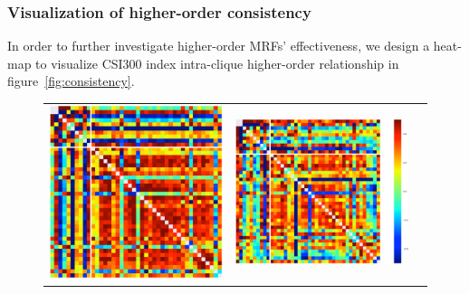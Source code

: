 \documentclass[sigconf,anonymous,review]{acmart}
\begin{document}
\subsubsection{Visualization of higher-order consistency}

In order to further investigate higher-order MRFs' effectiveness,
we design a heat-map to visualize CSI300 index intra-clique
higher-order relationship in figure~\ref{fig:consistency}.

\begin{figure}[t]
  \centering
  \setlength{\tabcolsep}{20pt}
  \begin{tabular}{ccc}
  \includegraphics[width=0.45\columnwidth]{Methodology/figures/gt.png}&
  

    
\includegraphics[width=0.54\columnwidth]{Methodology/figures/hmpl.png}&


\end{tabular}
\end{figure}
\end{document}

